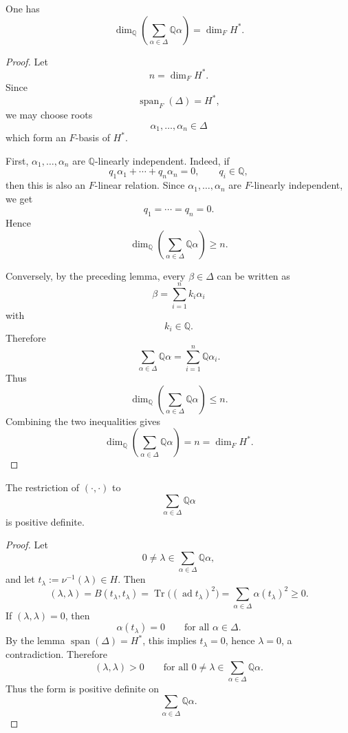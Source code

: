 \begin{corollary}
    One has
    \[
        \dim_{\mathbb{Q}}\!\left(\sum_{\alpha\in\Delta}\mathbb{Q}\alpha\right)
        =
        \dim_F H^*.
    \]
\end{corollary}

\begin{proof}
    Let
    \[
        n=\dim_F H^*.
    \]
    Since
    \[
        \operatorname{span}_F(\Delta)=H^*,
    \]
    we may choose roots
    \[
        \alpha_1,\dots,\alpha_n\in\Delta
    \]
    which form an \(F\)-basis of \(H^*\).

    First, \(\alpha_1,\dots,\alpha_n\) are \(\mathbb{Q}\)-linearly independent.
    Indeed, if
    \[
        q_1\alpha_1+\cdots+q_n\alpha_n=0,
        \qquad q_i\in\mathbb{Q},
    \]
    then this is also an \(F\)-linear relation. Since
    \(\alpha_1,\dots,\alpha_n\) are \(F\)-linearly independent, we get
    \[
        q_1=\cdots=q_n=0.
    \]
    Hence
    \[
        \dim_{\mathbb{Q}}\!\left(\sum_{\alpha\in\Delta}\mathbb{Q}\alpha\right)
        \geq n.
    \]

    Conversely, by the preceding lemma, every \(\beta\in\Delta\) can be written as
    \[
        \beta=\sum_{i=1}^n k_i\alpha_i
    \]
    with
    \[
        k_i\in\mathbb{Q}.
    \]
    Therefore
    \[
        \sum_{\alpha\in\Delta}\mathbb{Q}\alpha
        =
        \sum_{i=1}^n \mathbb{Q}\alpha_i.
    \]
    Thus
    \[
        \dim_{\mathbb{Q}}\!\left(\sum_{\alpha\in\Delta}\mathbb{Q}\alpha\right)
        \leq n.
    \]
    Combining the two inequalities gives
    \[
        \dim_{\mathbb{Q}}\!\left(\sum_{\alpha\in\Delta}\mathbb{Q}\alpha\right)
        =
        n
        =
        \dim_F H^*.
    \]
\end{proof}

\begin{lemma}
    The restriction of \((\cdot,\cdot)\) to
    \[
        \sum_{\alpha\in\Delta}\mathbb{Q}\alpha
    \]
    is positive definite.
\end{lemma}

\begin{proof}
    Let
    \[
        0\neq \lambda\in \sum_{\alpha\in\Delta}\mathbb{Q}\alpha,
    \]
    and let \(t_\lambda:=\nu^{-1}(\lambda)\in H\). Then
    \[
        (\lambda,\lambda)
        =
        B(t_\lambda,t_\lambda)
        =
        \operatorname{Tr}\!\bigl((\operatorname{ad}t_\lambda)^2\bigr)
        =
        \sum_{\alpha\in\Delta}\alpha(t_\lambda)^2
        \ge 0.
    \]
    If \((\lambda,\lambda)=0\), then
    \[
        \alpha(t_\lambda)=0
        \qquad
        \text{for all }\alpha\in\Delta.
    \]
    By the lemma \(\operatorname{span}(\Delta)=H^*\), this implies \(t_\lambda=0\),
    hence \(\lambda=0\), a contradiction. Therefore
    \[
        (\lambda,\lambda)>0
        \qquad
        \text{for all }0\neq \lambda\in \sum_{\alpha\in\Delta}\mathbb{Q}\alpha.
    \]
    Thus the form is positive definite on
    \[
        \sum_{\alpha\in\Delta}\mathbb{Q}\alpha.
    \]
\end{proof}


